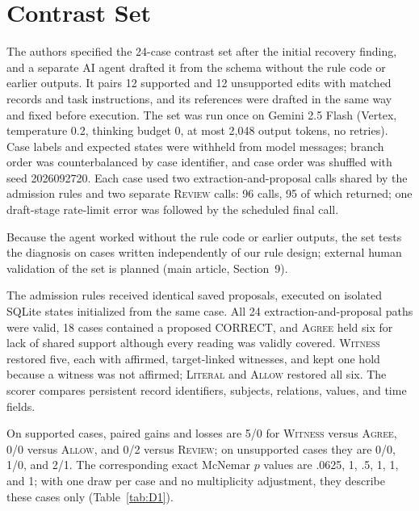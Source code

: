 \documentclass[acmsmall,review]{acmart}
\newcommand{\agree}{\textsc{Agree}}
\newcommand{\allow}{\textsc{Allow}}
\newcommand{\literal}{\textsc{Literal}}
\newcommand{\witness}{\textsc{Witness}}
\newcommand{\review}{\textsc{Review}}
\begin{document}
\section{Contrast Set}
The authors specified the 24-case contrast set after the initial recovery finding, and a separate AI agent drafted it from the schema without the rule code or earlier outputs. It pairs 12 supported and 12 unsupported edits with matched records and task instructions, and its references were drafted in the same way and fixed before execution. The set was run once on Gemini 2.5 Flash (Vertex, temperature 0.2, thinking budget 0, at most 2,048 output tokens, no retries). Case labels and expected states were withheld from model messages; branch order was counterbalanced by case identifier, and case order was shuffled with seed 2026092720. Each case used two extraction-and-proposal calls shared by the admission rules and two separate \review{} calls: 96 calls, 95 of which returned; one draft-stage rate-limit error was followed by the scheduled final call.

Because the agent worked without the rule code or earlier outputs, the set tests the diagnosis on cases written independently of our rule design; external human validation of the set is planned (main article, Section~9).

The admission rules received identical saved proposals, executed on isolated SQLite states initialized from the same case. All 24 extraction-and-proposal paths were valid, 18 cases contained a proposed CORRECT, and \agree{} held six for lack of shared support although every reading was validly covered. \witness{} restored five, each with affirmed, target-linked witnesses, and kept one hold because a witness was not affirmed; \literal{} and \allow{} restored all six. The scorer compares persistent record identifiers, subjects, relations, values, and time fields.

On supported cases, paired gains and losses are 5/0 for \witness{} versus \agree{}, 0/0 versus \allow{}, and 0/2 versus \review{}; on unsupported cases they are 0/0, 1/0, and 2/1. The corresponding exact McNemar $p$ values are .0625, 1, .5, 1, 1, and 1; with one draw per case and no multiplicity adjustment, they describe these cases only (Table~\ref{tab:D1}).
\end{document}
